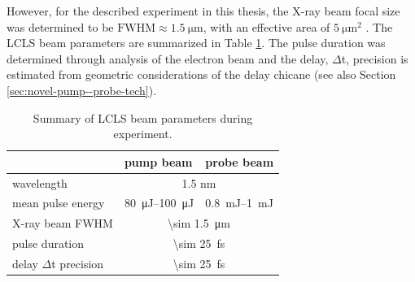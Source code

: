 %
However, for the described experiment in this thesis, the X-ray beam focal size was determined to be $\text{FWHM}\approx \SI{1.5}{\micro\meter}$, with an effective area of $\SI{5}{\micro\meter\squared}$ \citep{Bucher-2016-Unpublished}. The LCLS beam parameters are summarized in Table \ref{tab:beam-params}. The pulse duration was determined through analysis of the electron beam and the delay, $\Delta$t, precision is estimated from geometric considerations of the delay chicane (see also Section \ref{sec:novel-pump--probe-tech}).
\begin{table}
	\centering
		\begin{tabular}{ | l | l | l | }
		\hline
			 & pump beam & probe beam  \\ \hline
			wavelength & \multicolumn{2}{|c|}{1.5 nm} \\ \hline
			mean pulse energy & \SIrange{80}{100}{\micro\joule} & \SIrange{0.8}{1}{\milli\joule} \\ \hline
			X-ray beam FWHM & \multicolumn{2}{|c|}{\SI{\sim 1.5}{\micro\meter}} \\ \hline
			pulse duration & \multicolumn{2}{|c|}{\SI{\sim 25}{\femto\second}} \\ \hline
			delay $\Delta$t precision & \multicolumn{2}{|c|}{\SI{\sim 25}{\femto\second}} \\ \hline
		\end{tabular}
	\caption{Summary of LCLS beam parameters during experiment.}
	\label{tab:beam-params}
\end{table}
%
%
%
